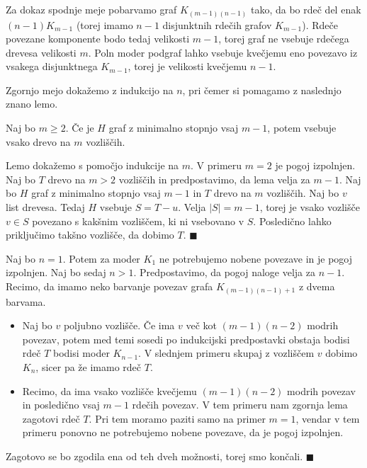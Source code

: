 \documentclass[twoside,11pt]{article}
\providecommand{\abs}[1]{\left\lvert #1\right\rvert}
\begin{document}
\begin{dokaz}
    Za dokaz spodnje meje pobarvamo graf $K_{(m-1)(n-1)}$ tako, da bo rdeč del enak 
    $(n-1)K_{m-1}$ (torej imamo $n-1$ disjunktnih rdečih grafov $K_{m-1}$). Rdeče povezane komponente 
    bodo tedaj velikosti $m-1$, torej graf ne vsebuje rdečega drevesa velikosti $m$. Poln moder 
    podgraf lahko vsebuje kvečjemu eno povezavo iz vsakega disjunktnega $K_{m-1}$, torej je 
    velikosti kvečjemu $n-1$.

    Zgornjo mejo dokažemo z indukcijo na $n$, pri čemer si pomagamo z naslednjo znano lemo.
    \begin{lema*}
        Naj bo $m \ge 2$. Če je $H$ graf z minimalno stopnjo vsaj $m-1$, potem vsebuje vsako drevo na $m$ vozliščih.
    \end{lema*}
    \begin{dokaz}
        Lemo dokažemo s pomočjo indukcije na $m$. V primeru $m=2$ je pogoj izpolnjen. Naj bo 
        $T$ drevo na $m > 2$ vozliščih in predpostavimo, da lema velja za $m-1$. Naj bo $H$ 
        graf z minimalno stopnjo vsaj $m-1$ in $T$ drevo na $m$ vozliščih. Naj bo $v$ list drevesa. 
        Tedaj $H$ vsebuje $S = T - u$. Velja $\abs{S} = {m-1}$, torej je vsako vozlišče 
        $v \in S$ povezano s kakšnim vozliščem, ki ni vsebovano v $S$. Posledično lahko 
        priključimo takšno vozlišče, da dobimo $T$. \hfill $\blacksquare$
    \end{dokaz}
    Naj bo $n = 1$. Potem za moder $K_1$ ne potrebujemo nobene povezave in je pogoj izpolnjen. 
    Naj bo sedaj $n > 1$. Predpostavimo, da pogoj naloge velja za $n - 1$. Recimo, da imamo neko barvanje povezav grafa $K_{(m-1)(n-1)+1}$ z dvema barvama. 
    \begin{itemize}
        \item Naj bo $v$ poljubno vozlišče. Če ima $v$ več kot $(m-1)(n-2)$ modrih povezav, potem med temi sosedi 
        po indukcijski predpostavki obstaja bodisi rdeč $T$ bodisi moder $K_{n-1}$. V slednjem 
        primeru skupaj z vozliščem $v$ dobimo $K_n$, sicer pa že imamo rdeč $T$.
        \item Recimo, da ima vsako vozlišče kvečjemu $(m-1)(n-2)$ modrih povezav in posledično 
        vsaj $m-1$ rdečih povezav. V tem primeru nam zgornja lema zagotovi rdeč $T$. Pri tem 
        moramo paziti samo na primer $m = 1$, vendar v tem primeru ponovno ne potrebujemo 
        nobene povezave, da je pogoj izpolnjen.
    \end{itemize}
    Zagotovo se bo zgodila ena od teh dveh možnosti, torej smo končali.  \hfill $\blacksquare$
\end{dokaz}
\end{document}
